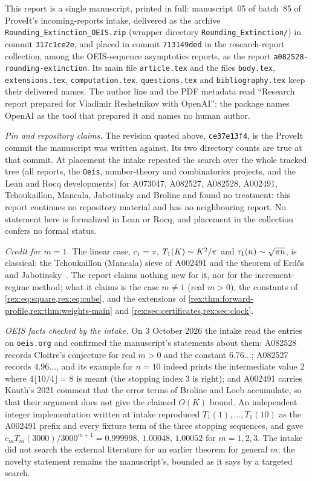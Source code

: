 \begin{writenote}
This report is a single manuscript, printed in full: manuscript~05 of
batch~85 of ProveIt's incoming-reports intake, delivered as the archive
\texttt{Rounding\_\allowbreak Extinction\_\allowbreak OEIS.zip} (wrapper
directory \texttt{Rounding\_\allowbreak Extinction/}) in commit
\texttt{317c1ce2e}, and placed in commit \texttt{713149ded} in the
research-report collection, among the OEIS-sequence asymptotics reports, as
the report \texttt{a082528-\allowbreak rounding-\allowbreak extinction}. Its
main file \texttt{article.tex} and the \verb|| files
\texttt{body.tex}, \texttt{extensions.tex}, \texttt{computation.tex},
\texttt{questions.tex} and \texttt{bibliography.tex} keep their delivered
names. The author line and the PDF metadata read ``Research report prepared
for Vladimir Reshetnikov with OpenAI'': the package names OpenAI as the tool
that prepared it and names no human author.

\emph{Pin and repository claims.} The revision quoted above,
\texttt{ce37e13f4}, is the ProveIt commit the manuscript was written
against. Its two directory counts are true at that commit. At placement the
intake repeated the search over the whole tracked tree (all reports, the
\texttt{Oeis}, number-theory and combinatorics projects, and the Lean and Rocq
developments) for A073047, A082527, A082528, A002491, Tchoukaillon, Mancala,
Jabotinsky and Broline and found no treatment: this report continues no
repository material and has no neighbouring report. No statement here is
formalized in Lean or Rocq, and placement in the collection confers no formal
status.

\emph{Credit for $m=1$.} The linear case, $c_1=\pi$, $T_1(K)\mathrel{\sim} K^2/\pi$ and
$\tau_1(n)\mathrel{\sim}\sqrt{\pi n}$, is classical: the Tchoukaillon (Mancala) sieve
of A002491 and the theorem of Erd\H{o}s and
Jabotinsky~\cite{erdos-jabotinsky}. The report claims nothing new for it, nor
for the increment-regime method; what it claims is the case $m\neq1$ (real
$m>0$), the constants of \cref{rex:eq:square,rex:eq:cube}, and the extensions
of \cref{rex:thm:forward-profile,rex:thm:weights-main} and
\cref{rex:sec:certificates,rex:sec:clock}.

\emph{OEIS facts checked by the intake.} On 3 October 2026 the intake read
the entries on \texttt{oeis.org} and confirmed the manuscript's statements
about them: A082528 records Cloitre's conjecture for real $m>0$ and the
constant $6.76\ldots$; A082527 records $4.96\ldots$, and its example for
$n=10$ indeed prints the intermediate value $2$ where $4\lfloor10/4\rfloor=8$
is meant (the stopping index $3$ is right); and A002491 carries Knuth's 2021
comment that the error terms of Broline and Loeb accumulate, so that their
argument does not give the claimed $O(K)$ bound. An independent integer
implementation written at intake reproduced $T_1(1),\ldots,T_1(10)$ as the
A002491 prefix and every fixture term of the three stopping sequences, and
gave $c_mT_m(3000)/3000^{m+1}=0.999998$, $1.00048$, $1.00052$ for $m=1,2,3$.
The intake did not search the external literature for an earlier theorem for
general $m$; the novelty statement remains the manuscript's, bounded as it
says by a targeted search.


\end{writenote}
